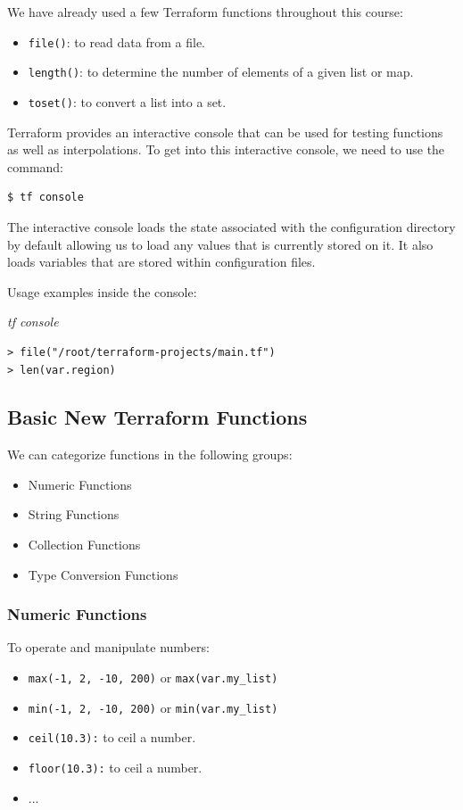 \documentclass{article}
\newenvironment{codetemplate}[1][]{%
  \mybasecolorbox[#1]
  \itshape
}{%
  \endmybasecolorbox
}
\begin{document}
We have already used a few Terraform functions throughout this course:
\begin{itemize}
    \item \verb|file()|: to read data from a file.
    \item \verb|length()|: to determine the number of elements of a given list or map.
    \item \verb|toset()|: to convert a list into a set.
\end{itemize}

Terraform provides an interactive console that can be used for testing functions as well as interpolations. To get into this interactive console, we need to use the command:
\begin{codetemplate}{}
\begin{verbatim}
$ tf console
\end{verbatim}
\end{codetemplate}

The interactive console loads the state associated with the configuration directory by default allowing us to load any values that is currently stored on it. It also loads variables that are stored within configuration files.

Usage examples inside the console:

\begin{codetemplate}{tf console}
\begin{verbatim}
> file("/root/terraform-projects/main.tf")
> len(var.region)
\end{verbatim}
\end{codetemplate}

\subsection{Basic New Terraform Functions}
We can categorize functions in the following groups:
\begin{itemize}
    \item Numeric Functions
    \item String Functions
    \item Collection Functions
    \item Type Conversion Functions
\end{itemize}

\subsubsection{Numeric Functions}
To operate and manipulate numbers:
\begin{itemize}
    \item \verb+max(-1, 2, -10, 200)+ or \verb+max(var.my_list)+
    \item \verb+min(-1, 2, -10, 200)+ or \verb+min(var.my_list)+
    \item \verb|ceil(10.3):| to ceil a number.
    \item \verb|floor(10.3):| to ceil a number.
    \item ...
\end{itemize}
\end{document}
